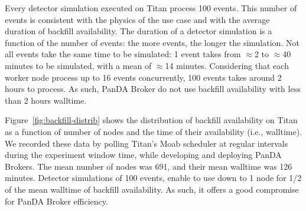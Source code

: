 Every detector simulation executed on Titan process 100 events. This number of
events is consistent with the physics of the use case and with the average
duration of backfill availability. The duration of a detector simulation is a
function of the number of events: the more events, the longer the simulation.
Not all events take the same time to be simulated:
1 event takes from $\approx$2 to $\approx$40 minutes to be simulated, with a
mean of $\approx$14 minutes. Considering that each worker node process up to 16
events concurrently, 100 events takes around 2 hours to process. As such, PanDA Broker do not use backfill availability with less than 2 hours walltime.


Figure~\ref{fig:backfill-distrib} shows the distribution of backfill
availability on Titan as a function of number of nodes and the time of their
availability (i.e., walltime). We recorded these data by polling Titan's Moab
scheduler at regular intervals during the experiment window time, while
developing and deploying PanDA Brokers. The mean number of nodes was 691, and
their mean walltime was 126 minutes. Detector simulations of 100 events, enable
to use down to 1 node for 1/2 of the mean walltime of backfill availability. As
such, it offers a good compromise for PanDA Broker efficiency.

